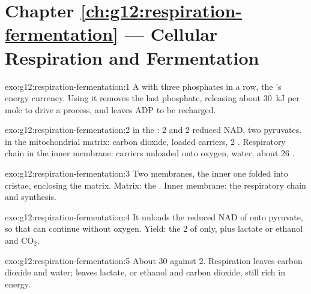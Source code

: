 \section*{Chapter \ref{ch:g12:respiration-fermentation} --- Cellular Respiration and Fermentation}

\begin{solution}{exo:g12:respiration-fermentation:1}
A  with three phosphates in a row, the 's energy
currency. Using it removes the last phosphate, releasing about
\qty{30}{kJ} per mole to drive a process, and leaves ADP to be
recharged.
\end{solution}

\begin{solution}{exo:g12:respiration-fermentation:2}
 in the : 2  and 2 reduced NAD, two pyruvates.
 in the mitochondrial matrix: carbon dioxide, loaded
carriers, 2 . Respiratory chain in the inner membrane: carriers
unloaded onto oxygen, water, about 26 .
\end{solution}

\begin{solution}{exo:g12:respiration-fermentation:3}
Two membranes, the inner one folded into cristae, enclosing the
matrix. Matrix: the . Inner membrane: the respiratory chain
and  synthesis.
\end{solution}

\begin{solution}{exo:g12:respiration-fermentation:4}
It unloads the reduced NAD of  onto pyruvate, so that
 can continue without oxygen. Yield: the 2  of 
only, plus lactate or ethanol and $\mathrm{CO_2}$.
\end{solution}

\begin{solution}{exo:g12:respiration-fermentation:5}
About 30  against 2. Respiration leaves carbon dioxide and water;
 leaves lactate, or ethanol and carbon dioxide, still rich
in energy.
\end{solution}

